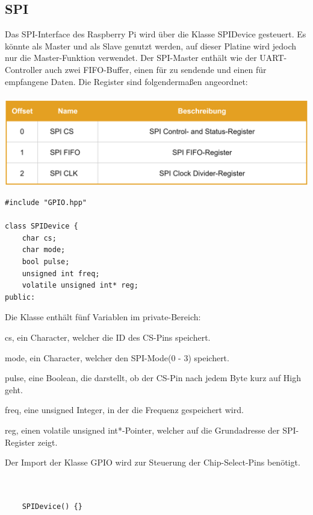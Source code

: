 \documentclass[12pt]{article}
\begin{document}
\subsection{SPI}
Das SPI-Interface des Raspberry Pi wird über die Klasse SPIDevice gesteuert. Es könnte als Master und als Slave genutzt werden, auf dieser Platine wird jedoch nur die Master-Funktion verwendet. Der SPI-Master enthält wie der UART-Controller auch zwei FIFO-Buffer, einen für zu sendende und einen für empfangene Daten. Die Register sind folgendermaßen angeordnet:\\\\
\includegraphics[width=\textwidth]{img/spi_table.PNG}
\begin{center}\end{center}
\begin{verbatim}
#include "GPIO.hpp"

class SPIDevice {
    char cs;
    char mode;
    bool pulse;
    unsigned int freq;
    volatile unsigned int* reg;
public:
\end{verbatim}
Die Klasse enthält fünf Variablen im private-Bereich:
\begin{compactitem}
\item cs, ein Character, welcher die ID des CS-Pins speichert.
\item mode, ein Character, welcher den SPI-Mode(0 - 3) speichert.
\item pulse, eine Boolean, die darstellt, ob der CS-Pin nach jedem Byte kurz auf High geht.
\item freq, eine unsigned Integer, in der die Frequenz gespeichert wird.
\item reg, einen volatile unsigned int*-Pointer, welcher auf die Grundadresse der SPI-Register zeigt.
\end{compactitem} Der Import der Klasse GPIO wird zur Steuerung der Chip-Select-Pins benötigt.\\\\\\
\begin{verbatim}
    SPIDevice() {}
\end{verbatim}
\end{document}
